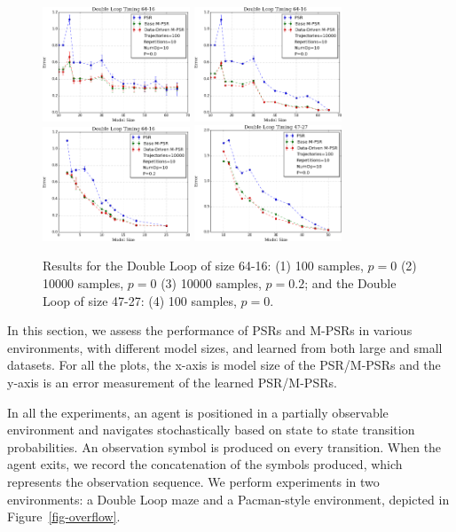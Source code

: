 \documentclass[letterpaper]{article}
\begin{document}
\begin{figure}[ht!]
\centering
\includegraphics[width=44mm]{64-16-100.png}%
\includegraphics[width=44mm]{64-16-10000.png}%
\includegraphics[width=44mm]{NoiseInfo.png}%
\includegraphics[width=44mm]{47-27-10000.png}%
\caption{Results for the Double Loop of size 64-16: (1) 100 samples, $p = 0$ (2) 10000 samples, $p = 0$ (3) 10000 samples, $p = 0.2$; and the Double Loop of size 47-27: (4) 100 samples, $p = 0$.
\label{fig-double}\vspace*{-4mm}}
\end{figure}

In this section, we assess the performance of PSRs and M-PSRs in various environments, with different model sizes, and learned from both large and small datasets. For all the plots, the x-axis is model size of the PSR/M-PSRs and the y-axis is an error measurement of the learned PSR/M-PSRs.

In all the experiments, an agent is positioned in  a partially observable environment and navigates stochastically based on state to state transition probabilities. An observation symbol is produced on every transition. When the agent exits, we record the concatenation of the symbols produced, which represents the observation sequence.  We perform experiments in two environments: a Double Loop maze and a Pacman-style environment, depicted in Figure~\ref{fig-overflow}.
\end{document}
